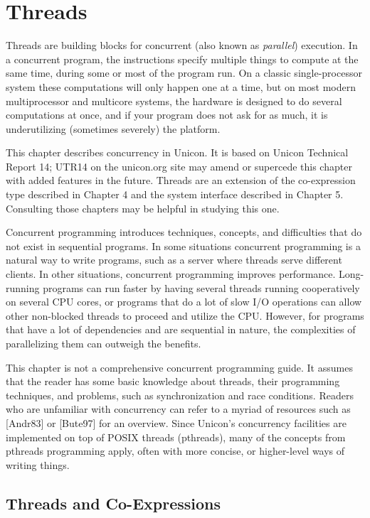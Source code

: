 \chapter{Threads}

Threads are building blocks for concurrent (also known as
\emph{parallel}) execution. In a concurrent program, the instructions
specify multiple things to compute at the same time, during some or
most of the program run.  On a classic single-processor system these
computations will only happen one at a time, but on most modern
multiprocessor and multicore systems, the hardware is designed to do
several computations at once, and if your program does not ask for as
much, it is underutilizing (sometimes severely) the platform.

This chapter describes concurrency in Unicon. It is based on Unicon
Technical Report 14; UTR14 on the unicon.org site may amend or supercede
this chapter with added features in the future.  Threads are an extension
of the co-expression type described in Chapter 4 and the system interface
described in Chapter 5.  Consulting those chapters may be helpful in
studying this one.

Concurrent programming introduces techniques, concepts, and
difficulties that do not exist in sequential programs. In some
situations concurrent programming is a natural way to write programs,
such as a server where threads serve different clients. In other
situations, concurrent programming improves performance. Long-running
programs can run faster by having several threads running
cooperatively on several CPU cores, or programs that do a lot of slow
I/O operations can allow other non-blocked threads to proceed and
utilize the CPU. However, for programs that have a lot of dependencies
and are sequential in nature, the complexities of parallelizing them
can outweigh the benefits.

This chapter is not a comprehensive concurrent programming guide. It
assumes that the reader has some basic knowledge about threads, their
programming techniques, and problems, such as synchronization and race
conditions. Readers who are unfamiliar with concurrency can refer to a
myriad of resources such as [Andr83] or [Bute97] for an
overview. Since Unicon's concurrency facilities are implemented on top
of POSIX threads (pthreads), many of the concepts from pthreads
programming apply, often with more concise, or higher-level ways of
writing things.

\section{Threads and Co-Expressions}

